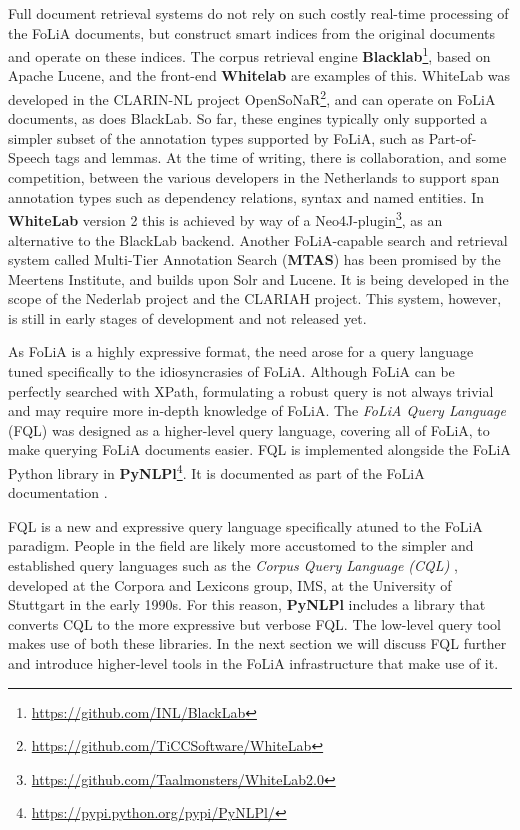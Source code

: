 \documentclass[a4paper,11pt]{article}
\begin{document}
Full document retrieval systems do not rely on such costly real-time processing
of the FoLiA documents, but construct smart indices from the original documents
and operate on these indices. The corpus retrieval engine
\textbf{Blacklab}\footnote{\url{https://github.com/INL/BlackLab}}, based on
Apache Lucene, and the front-end \textbf{Whitelab}
\cite{ReynaertVandecampVanzaanen2014ColingDemo} are examples of this. WhiteLab
was developed in the CLARIN-NL project
OpenSoNaR\footnote{\url{https://github.com/TiCCSoftware/WhiteLab}}, and can
operate on FoLiA documents, as does BlackLab. So far, these engines typically
only supported a simpler subset of the annotation types supported by FoLiA,
such as Part-of-Speech tags and lemmas.  At the time of writing, there is
collaboration, and some competition, between the various developers in the
Netherlands to support span annotation types such as dependency relations,
syntax and named entities. In \textbf{WhiteLab} version 2 this is achieved by way of a
Neo4J-plugin\footnote{\url{https://github.com/Taalmonsters/WhiteLab2.0}}, as an
alternative to the BlackLab backend. Another FoLiA-capable search and retrieval
system called Multi-Tier Annotation Search (\textbf{MTAS}) has been promised by
the Meertens Institute, and builds upon Solr and Lucene. It is being developed in
the scope of the Nederlab project \cite{Nederlab2016} and the CLARIAH project.
This system, however, is still in early stages of development and not released
yet.


As FoLiA is a highly expressive format, the need arose for a query language
tuned specifically to the idiosyncrasies of FoLiA. Although FoLiA can be
perfectly searched with XPath, formulating a robust query is not always trivial
and may require more in-depth knowledge of FoLiA. The \emph{FoLiA Query
Language} (FQL) was designed as a higher-level query language, covering all of
FoLiA, to make querying FoLiA documents easier. FQL is implemented alongside
the FoLiA Python library in
\textbf{PyNLPl}\footnote{\url{https://pypi.python.org/pypi/PyNLPl/}}. It is documented as part
of the FoLiA documentation \cite{FOLIADOC2014}.

FQL is a new and expressive query language specifically atuned to the FoLiA
paradigm. People in the field are likely more accustomed to the simpler and
established query languages such as the \emph{Corpus Query Language (CQL)}
\cite{CWB-Christ94}, developed at the Corpora and Lexicons group, IMS, at the
University of Stuttgart in the early 1990s. For this reason, \textbf{PyNLPl}
includes a library that converts CQL to the more expressive but verbose FQL.
The low-level query tool makes use of both these libraries. In the next section
we will discuss FQL further and introduce higher-level tools in the FoLiA
infrastructure that make use of it.
\end{document}
